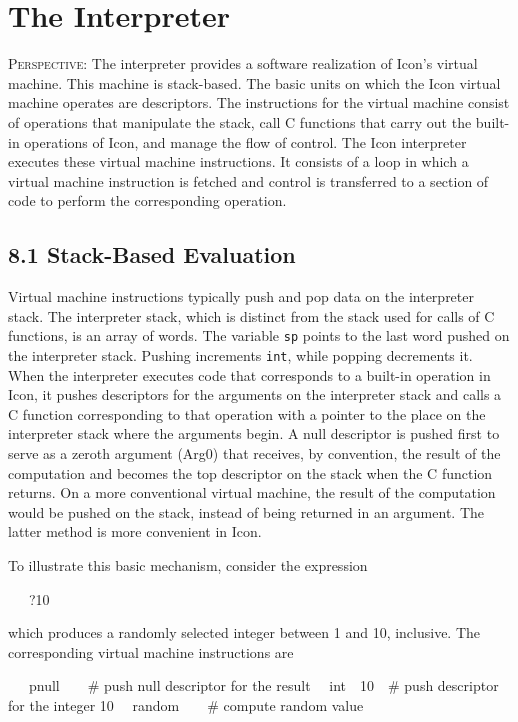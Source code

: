 \chapter{The Interpreter}

\textsc{Perspective}: The interpreter provides a software realization
of Icon's virtual machine. This machine is stack-based. The basic
units on which the Icon virtual machine operates are descriptors. The
instructions for the virtual machine consist of operations that
manipulate the stack, call C functions that carry out the built-in
operations of Icon, and manage the flow of control. The Icon
interpreter executes these virtual machine instructions.  It consists
of a loop in which a virtual machine instruction is fetched and
control is transferred to a section of code to perform the
corresponding operation.

\section[8.1 Stack-Based Evaluation]{8.1 Stack-Based Evaluation}

Virtual machine instructions typically push and pop data on the
interpreter stack. The interpreter stack, which is distinct from the
stack used for calls of C functions, is an array of words. The
variable \texttt{sp} points to the last word pushed on the interpreter
stack. Pushing increments \texttt{int}, while popping decrements
it. When the interpreter executes code that corresponds to a built-in
operation in Icon, it pushes descriptors for the arguments on the
interpreter stack and calls a C function corresponding to that
operation with a pointer to the place on the interpreter stack where
the arguments begin. A null descriptor is pushed first to serve as a
{\textquotedbl}zeroth{\textquotedbl} argument (Arg0) that receives, by
convention, the result of the computation and becomes the top
descriptor on the stack when the C function returns. On a more
conventional virtual machine, the result of the computation would be
pushed on the stack, instead of being returned in an argument. The
latter method is more convenient in Icon.

To illustrate this basic mechanism, consider the expression

{\ttfamily\mdseries
\ \ \ ?10}

\noindent which produces a randomly selected integer between 1 and 10,
inclusive. The corresponding virtual machine instructions are

{\ttfamily\mdseries
\ \ \ pnull\ \ \ \ \# push null descriptor for the result\newline
 \ \ int\ \ 10\ \ \# push descriptor for the integer 10\newline
 \ \ random\ \ \ \ \# compute random value}

